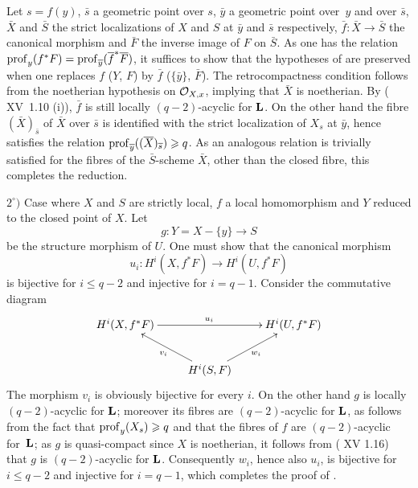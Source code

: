 Let $s=f(y)$, $\bar s$ a geometric point over $s$, $\bar y$ a geometric point over~$y$ and over $\bar s$, $\bar X$ and $\bar S$ the strict localizations of $X$ and $S$ at $\bar y$ and $\bar s$ respectively, $\bar f:\bar X\to\bar S$ the canonical morphism and $\bar F$ the inverse image of $F$ on $\bar S$. As one has the relation $\operatorname{prof}_y(f^*F)=\operatorname{prof}_{\overline y}(\overline f^*\overline F)$, it suffices to show that the hypotheses of  are preserved when one replaces $f$ (\resp $Y$, \resp $F$) by $\bar f$ (\resp $\{\bar y\}$, \resp $\bar F$). The retrocompactness condition follows from the noetherian hypothesis on ${\mathcal O}_{X, x}$, implying that $\bar X$ is noetherian. By ( XV~1.10 \textup{(i)}), $\bar f$ is still locally $(q-2)$-acyclic for $\mathbf{L}$. On the other hand the fibre $(\bar X)_{\bar s}$ of $\bar X$ over $\bar s$ is identified with the strict localization of $X_s$ at $\bar y$, hence satisfies the relation $\operatorname{prof}_{\overline y}((\overline X)_{\overline s})\geqslant q$. As an analogous relation is trivially satisfied for the fibres of the $\bar S$-scheme $\bar X$, other than the closed fibre, this completes the reduction.

$2^\circ)$ Case where $X$ and $S$ are strictly local, $f$ a local homomorphism and $Y$ reduced to the closed point of $X$. Let
$$g:Y=X-\{y\}\to S$$
be the structure morphism of $U$. One must show that the canonical morphism
$$u_i:H^i(X, f^*F)\to H^i(U, f^*F)$$
is bijective for $i\leq q-2$ and injective for $i=q-1$. Consider the commutative diagram
$$
\xymatrix{H^i(X, f^*F)\ar[rr]^{u_i}&& H^i(U, f^*F)\\&H^i(S, F)\ar[lu]^{v_i}\ar[ru]_{w_i}}$$
The morphism $v_i$ is obviously bijective for every $i$. On the other hand $g$ is locally $(q-2)$-acyclic for $\mathbf{L}$; moreover its fibres are $(q-2)$-acyclic for $\mathbf{L}$, as follows from the fact that $\operatorname{prof}_y(X_s)\geqslant q$ and that the fibres of $f$ are $(q-2)$-acyclic for~$\mathbf{L}$; as $g$ is quasi-compact since $X$ is noetherian, it follows from ( XV 1.16) that $g$ is $(q-2)$-acyclic for $\mathbf{L}$. Consequently $w_i$, hence also $u_i$, is bijective for $i\leq q-2$ and injective for $i=q-1$, which completes the proof of .


